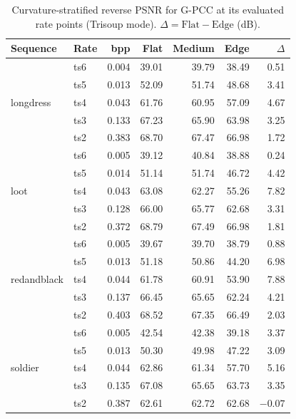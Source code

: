 \begin{table}[t]
  \centering
  \caption{%
    Curvature-stratified reverse PSNR for G-PCC at its evaluated rate points
    (Trisoup mode).
    $\Delta = \text{Flat} - \text{Edge}$ (dB).
  }
  \label{tab:gpcc-oversmoothing}
  \small
  \setlength{\tabcolsep}{4pt}
  \begin{tabular}{llrrrrr}
    \toprule
    Sequence & Rate & bpp & Flat & Medium & Edge & $\Delta$ \\
    \midrule
    \multirow{5}{*}{longdress}
      & ts6 & 0.004 & 39.01 & 39.79 & 38.49 & 0.51 \\
      & ts5 & 0.013 & 52.09 & 51.74 & 48.68 & 3.41 \\
      & ts4 & 0.043 & 61.76 & 60.95 & 57.09 & 4.67 \\
      & ts3 & 0.133 & 67.23 & 65.90 & 63.98 & 3.25 \\
      & ts2 & 0.383 & 68.70 & 67.47 & 66.98 & 1.72 \\
    \midrule
    \multirow{5}{*}{loot}
      & ts6 & 0.005 & 39.12 & 40.84 & 38.88 & 0.24 \\
      & ts5 & 0.014 & 51.14 & 51.74 & 46.72 & 4.42 \\
      & ts4 & 0.043 & 63.08 & 62.27 & 55.26 & 7.82 \\
      & ts3 & 0.128 & 66.00 & 65.77 & 62.68 & 3.31 \\
      & ts2 & 0.372 & 68.79 & 67.49 & 66.98 & 1.81 \\
    \midrule
    \multirow{5}{*}{redandblack}
      & ts6 & 0.005 & 39.67 & 39.70 & 38.79 & 0.88 \\
      & ts5 & 0.013 & 51.18 & 50.86 & 44.20 & 6.98 \\
      & ts4 & 0.044 & 61.78 & 60.91 & 53.90 & 7.88 \\
      & ts3 & 0.137 & 66.45 & 65.65 & 62.24 & 4.21 \\
      & ts2 & 0.403 & 68.52 & 67.35 & 66.49 & 2.03 \\
    \midrule
    \multirow{5}{*}{soldier}
      & ts6 & 0.005 & 42.54 & 42.38 & 39.18 & 3.37 \\
      & ts5 & 0.013 & 50.30 & 49.98 & 47.22 & 3.09 \\
      & ts4 & 0.044 & 62.86 & 61.34 & 57.70 & 5.16 \\
      & ts3 & 0.135 & 67.08 & 65.65 & 63.73 & 3.35 \\
      & ts2 & 0.387 & 62.61 & 62.72 & 62.68 & $-0.07$ \\
    \bottomrule
  \end{tabular}
\end{table}

